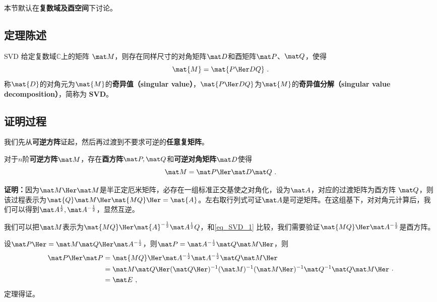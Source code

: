 


本节默认在\textbf{复数域及酉空间}下讨论。
\subsection{定理陈述} 
\begin{theorem}{SVD}
给定复数域$\mathbb{C}$上的矩阵 $\mat M$，则存在同样尺寸的对角矩阵$\mat D$和酉矩阵$\mat P$、$\mat Q$，使得
\begin{equation}
\mat{M} = \mat{P\Her DQ}~. 
\end{equation}
称$\mat{D}$的对角元为$\mat{M}$的\textbf{奇异值（singular value）}，$\mat{P\Her DQ}$为$\mat{M}$的\textbf{奇异值分解（singular value decomposition）}，简称为 \textbf{SVD}。
\end{theorem}


\subsection{证明过程}

我们先从\textbf{可逆方阵}证起，然后再过渡到不要求可逆的\textbf{任意复矩阵}。
\begin{theorem}{}\label{the_SVD_1}
对于$n$阶\textbf{可逆方阵}$\mat M$，存在\textbf{酉方阵}$\mat P,\mat Q$和\textbf{可逆对角矩阵}$\mat D$使得
\begin{equation}\label{eq_SVD_1}
\mat M=\mat P\Her \mat D\mat Q~.
\end{equation}

\end{theorem}
\textbf{证明：}因为$\mat M\Her \mat M$是半正定厄米矩阵，必存在一组标准正交基使之对角化，设为$\mat  A$，对应的过渡矩阵为酉方阵 $\mat Q$，则该过程表示为$\mat {Q}\mat M\Her \mat{MQ}\Her=\mat{A}$。左右取行列式可证$\mat A$是可逆矩阵。在这组基下，对对角元计算后，我们可以得到$\mat A^{\frac{1}{2}},\mat A^{-\frac{1}{2}}$，显然互逆。

我们可以把$\mat M$表示为$\mat {MQ}\Her \mat{A}^{-\frac{1}{2}}\mat A^{\frac{1}{2}}Q$，和\autoref{eq_SVD_1} 比较，我们需要验证$\mat {MQ}\Her \mat A^{-\frac{1}{2}}$是酉方阵。

设$\mat P\Her =\mat M\mat Q\Her \mat A^{-\frac{1}{2}}$，则$\mat P=\mat A^{-\frac{1}{2}}\mat Q\mat M\Her $，则
\begin{equation}
\begin{aligned}
\mat P\Her \mat P&=\mat {MQ}\Her  \mat A^{-\frac{1}{2}}\mat A^{-\frac{1}{2}}\mat Q\mat M\Her \\
&=\mat M\mat Q\Her (\mat Q\Her )^{-1}(\mat M)^{-1}(\mat M\Her )^{-1}\mat Q^{-1}\mat Q\mat M\Her \\
&=\mat E~,
\end{aligned}
~.
\end{equation}
定理得证。

